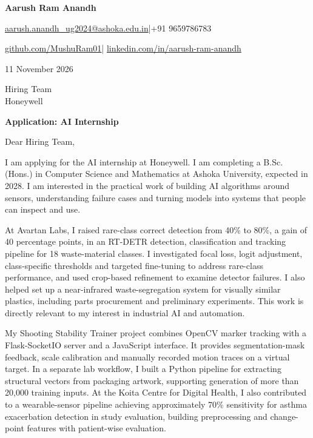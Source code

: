 \documentclass[11pt,a4paper]{article}
\begin{document}
{\LARGE\bfseries Aarush Ram Anandh}\par\vspace{4pt}
\href{mailto:aarush.anandh_ug2024@ashoka.edu.in}{aarush.anandh\_ug2024@ashoka.edu.in}\quad|\quad +91 9659786783\par\vspace{2pt}
\href{https://github.com/MushuRam01}{github.com/MushuRam01}\quad|\quad
\href{https://www.linkedin.com/in/aarush-ram-anandh/}{linkedin.com/in/aarush-ram-anandh}\par
\vspace{20pt}
11 November 2026\par\vspace{12pt}
Hiring Team\\
Honeywell\par\vspace{12pt}
\textbf{Application: AI Internship}\par\vspace{14pt}
Dear Hiring Team,\par\vspace{10pt}
I am applying for the AI internship at Honeywell. I am completing a B.Sc. (Hons.) in Computer Science and Mathematics at Ashoka University, expected in 2028. I am interested in the practical work of building AI algorithms around sensors, understanding failure cases and turning models into systems that people can inspect and use.\par\vspace{10pt}
At Avartan Labs, I raised rare-class correct detection from 40\% to 80\%, a gain of 40 percentage points, in an RT-DETR detection, classification and tracking pipeline for 18 waste-material classes. I investigated focal loss, logit adjustment, class-specific thresholds and targeted fine-tuning to address rare-class performance, and used crop-based refinement to examine detector failures. I also helped set up a near-infrared waste-segregation system for visually similar plastics, including parts procurement and preliminary experiments. This work is directly relevant to my interest in industrial AI and automation.\par\vspace{10pt}
My Shooting Stability Trainer project combines OpenCV marker tracking with a Flask-SocketIO server and a JavaScript interface. It provides segmentation-mask feedback, scale calibration and manually recorded motion traces on a virtual target. In a separate lab workflow, I built a Python pipeline for extracting structural vectors from packaging artwork, supporting generation of more than 20,000 training inputs. At the Koita Centre for Digital Health, I also contributed to a wearable-sensor pipeline achieving approximately 70\% sensitivity for asthma exacerbation detection in study evaluation, building preprocessing and change-point features with patient-wise evaluation.\par\vspace{10pt}
\end{document}

